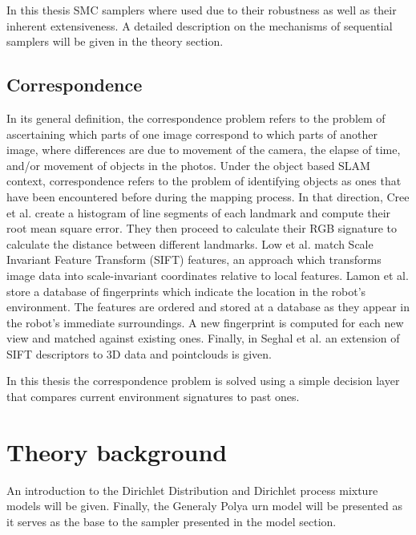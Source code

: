 \documentclass[twoside,hidelinks]{article}
\begin{document}
In this thesis SMC samplers where used due to their robustness as well as their inherent extensiveness. A detailed description on the mechanisms of sequential samplers will be given in the theory section.

\subsection{Correspondence}

In its general definition, the correspondence problem refers to the problem of ascertaining which parts of one image correspond to which parts of another image, where differences are due to movement of the camera, the elapse of time, and/or movement of objects in the photos. Under the object based SLAM context, correspondence refers to the problem of identifying objects as ones that have been encountered before during the mapping process. In that direction, Cree et al.\cite{corresp:first} create a histogram of line segments of each landmark and compute their root mean square error. They then proceed to calculate their RGB signature to calculate the distance between different landmarks. Low et al.\cite{corres:sec} match Scale Invariant Feature Transform (SIFT) features, an approach which transforms image data into scale-invariant coordinates relative to local features. Lamon et al.\cite{corres:three} store a database of fingerprints which indicate the location in the robot's environment. The features are ordered and stored at a database as they appear in the robot's immediate surroundings. A new fingerprint is computed for each new view and matched against existing ones. Finally, in Seghal et al.\cite{corres:four} an extension of SIFT descriptors to 3D data and pointclouds is given. 

In this thesis the correspondence problem is solved using a simple decision layer that compares current environment signatures to past ones.


\newpage
\section{Theory background}
\label{sec:theory}


An introduction to the Dirichlet Distribution and Dirichlet process mixture models will be given. Finally, the Generaly Polya urn model will be presented as it serves as the base to the sampler presented in the model section.
\end{document}
